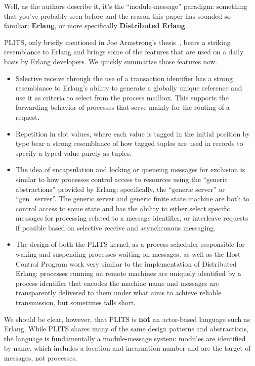 Well, as the authors describe it, it's the ``module-message'' paradigm: something that you've probably seen before and the reason this paper has sounded so familiar: \textbf{Erlang}, or more specifically \textbf{Distributed Erlang}.  

PLITS, only briefly mentioned in Joe Armstrong's thesis~\cite{armstrong2010erlang}, bears a striking resemblance to Erlang and brings some of the features that are used on a daily basis by Erlang developers.  We quickly summarize those features now.

\begin{itemize}
\item Selective receive through the use of a transaction identifier has a strong resemblance to Erlang's ability to generate a globally unique reference and use it as criteria to select from the process mailbox.  This supports the forwarding behavior of processes that serve mainly for the routing of a request.
\item Repetition in slot values, where each value is tagged in the initial position by type bear a strong resemblance of how tagged tuples are used in records to specify a typed value purely as tuples.  
\item The idea of encapsulation and locking or queueing messages for exclusion is similar to how processes control access to resources using the ``generic abstractions'' provided by Erlang: specifically, the ``generic server'' or ``gen\_server''.  The generic server and generic finite state machine are both to control access to some state and has the ability to either select specific messages for processing related to a message identifier, or interleave requests if possible based on selective receive and asynchronous messaging.
\item The design of both the PLITS kernel, as a process scheduler responsible for waking and suspending processes waiting on messages, as well as the Host Control Program work very similar to the implementation of Distributed Erlang: processes running on remote machines are uniquely identified by a process identifier that encodes the machine name and messages are transparently delivered to them under what aims to achieve reliable transmission, but sometimes falls short.
\end{itemize}

We should be clear, however, that PLITS is \textbf{not} an actor-based language such as Erlang.  While PLITS shares many of the same design patterns and abstractions, the language is fundamentally a module-message system: modules are identified by name, which includes a location and incarnation number and are the target of messages, not processes.
